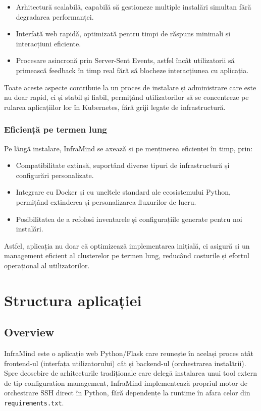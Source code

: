 \documentclass[12pt,a4paper]{report}
\begin{document}
\begin{itemize}
  \item Arhitectură scalabilă, capabilă să gestioneze multiple instalări simultan fără degradarea performanței.
  \item Interfață web rapidă, optimizată pentru timpi de răspuns minimali și interacțiuni eficiente.
  \item Procesare asincronă prin Server-Sent Events, astfel încât utilizatorii să primească feedback în timp real fără să blocheze interacțiunea cu aplicația.
\end{itemize}

Toate aceste aspecte contribuie la un proces de instalare și administrare care este nu doar rapid, ci și stabil și fiabil, permițând utilizatorilor să se concentreze pe rularea aplicațiilor lor în Kubernetes, fără griji legate de infrastructură.

\subsection{Eficiență pe termen lung}

Pe lângă instalare, InfraMind se axează și pe menținerea eficienței în timp, prin:

\begin{itemize}
  \item Compatibilitate extinsă, suportând diverse tipuri de infrastructură și configurări personalizate.
  \item Integrare cu Docker și cu uneltele standard ale ecosistemului Python, permițând extinderea și personalizarea fluxurilor de lucru.
  \item Posibilitatea de a refolosi inventarele și configurațiile generate pentru noi instalări.
\end{itemize}

Astfel, aplicația nu doar că optimizează implementarea inițială, ci asigură și un management eficient al clusterelor pe termen lung, reducând costurile și efortul operațional al utilizatorilor.

\chapter{Structura aplicației}
\label{cap:structura}
\section{Overview}

InfraMind este o aplicație web Python/Flask care reunește în același proces atât frontend-ul (interfața utilizatorului) cât și backend-ul (orchestrarea instalării). Spre deosebire de arhitecturile tradiționale care delegă instalarea unui tool extern de tip configuration management, InfraMind implementează propriul motor de orchestrare SSH direct în Python, fără dependențe la runtime în afara celor din \texttt{requirements.txt}.
\end{document}
